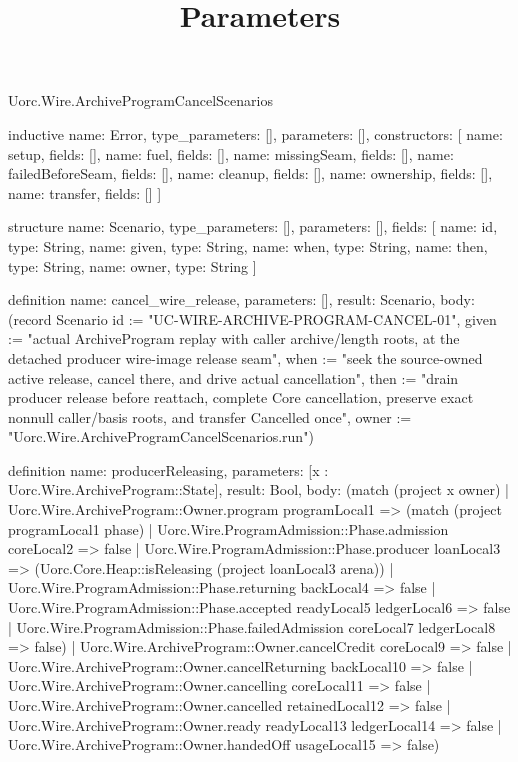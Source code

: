 \begin{lexlean}{Uorc.Wire.ArchiveProgramCancelScenarios}
\title{Parameters}
\begin{semanticmodule}
inductive{
  name: Error,
  type_parameters: [],
  parameters: [],
  constructors: [
    {name: setup, fields: []},
    {name: fuel, fields: []},
    {name: missingSeam, fields: []},
    {name: failedBeforeSeam, fields: []},
    {name: cleanup, fields: []},
    {name: ownership, fields: []},
    {name: transfer, fields: []}
  ]
}

structure{
  name: Scenario,
  type_parameters: [],
  parameters: [],
  fields: [
    {name: id, type: String},
    {name: given, type: String},
    {name: when, type: String},
    {name: then, type: String},
    {name: owner, type: String}
  ]
}

definition{
  name: cancel_wire_release,
  parameters: [],
  result: Scenario,
  body: (record Scenario {id := "UC-WIRE-ARCHIVE-PROGRAM-CANCEL-01", given := "actual ArchiveProgram replay with caller archive/length roots, at the detached producer wire-image release seam", when := "seek the source-owned active release, cancel there, and drive actual cancellation", then := "drain producer release before reattach, complete Core cancellation, preserve exact nonnull caller/basis roots, and transfer Cancelled once", owner := "Uorc.Wire.ArchiveProgramCancelScenarios.run"})
}

definition{
  name: producerReleasing,
  parameters: [x : Uorc.Wire.ArchiveProgram::State],
  result: Bool,
  body: (match (project x owner)
    | Uorc.Wire.ArchiveProgram::Owner.program programLocal1 => (match (project programLocal1 phase)
      | Uorc.Wire.ProgramAdmission::Phase.admission coreLocal2 => false
      | Uorc.Wire.ProgramAdmission::Phase.producer loanLocal3 => (Uorc.Core.Heap::isReleasing (project loanLocal3 arena))
      | Uorc.Wire.ProgramAdmission::Phase.returning backLocal4 => false
      | Uorc.Wire.ProgramAdmission::Phase.accepted readyLocal5 ledgerLocal6 => false
      | Uorc.Wire.ProgramAdmission::Phase.failedAdmission coreLocal7 ledgerLocal8 => false)
    | Uorc.Wire.ArchiveProgram::Owner.cancelCredit coreLocal9 => false
    | Uorc.Wire.ArchiveProgram::Owner.cancelReturning backLocal10 => false
    | Uorc.Wire.ArchiveProgram::Owner.cancelling coreLocal11 => false
    | Uorc.Wire.ArchiveProgram::Owner.cancelled retainedLocal12 => false
    | Uorc.Wire.ArchiveProgram::Owner.ready readyLocal13 ledgerLocal14 => false
    | Uorc.Wire.ArchiveProgram::Owner.handedOff usageLocal15 => false)
}


\end{semanticmodule}
\end{lexlean}
